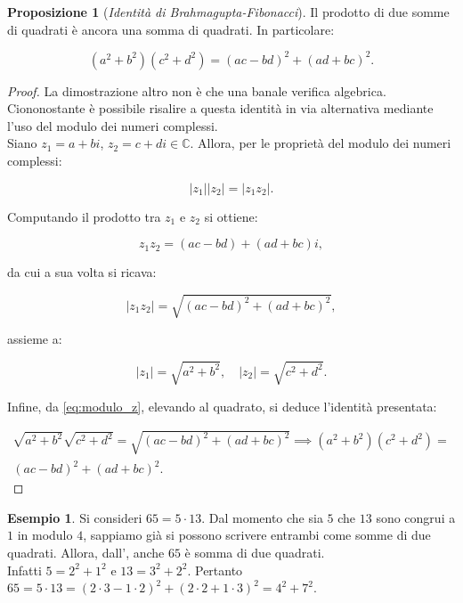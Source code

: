 \documentclass[a4paper]{article}
\newcommand{\norm}[1]{\left|#1\right|}
\newcommand{\CC}{\mathbb{C}}
\theoremstyle{definition}
\newtheorem{example}{Esempio}[section]
\newtheorem{proposition}{Proposizione}[section]
\begin{document}
\begin{proposition}[\textit{Identità di Brahmagupta-Fibonacci}]
    \label{prop:fibonacci}
    Il prodotto di due somme di quadrati è ancora una
    somma di quadrati. In particolare:

    \[ (a^2+b^2)(c^2+d^2)=(ac-bd)^2+(ad+bc)^2. \]
\end{proposition}

\begin{proof}
    La dimostrazione altro non è che una banale verifica
    algebrica. Ciononostante è possibile risalire a questa
    identità in via alternativa mediante l'uso
    del modulo dei numeri complessi. \\

    Siano $z_1=a+bi$, $z_2=c+di \in \CC$. Allora, per le proprietà
    del modulo dei numeri complessi:

    \begin{equation}
        \label{eq:modulo_z}
        \norm{z_1}\norm{z_2}=\norm{z_1z_2}.
    \end{equation}


    Computando il prodotto tra $z_1$ e $z_2$ si ottiene:

    \[ z_1z_2 = (ac-bd) + (ad+bc)i, \]

    da cui a sua volta si ricava:

    \[ \norm{z_1z_2} = \sqrt{(ac-bd)^2 + (ad+bc)^2}, \]

    assieme a:

    \[ \norm{z_1}=\sqrt{a^2+b^2}, \quad \norm{z_2}=\sqrt{c^2+d^2}. \]

    Infine, da \eqref{eq:modulo_z}, elevando al quadrato, si deduce l'identità
    presentata:

    \begin{multline*}
        \sqrt{a^2+b^2}\sqrt{c^2+d^2}=\sqrt{(ac-bd)^2 + (ad+bc)^2} \implies (a^2+b^2)(c^2+d^2)= \\ (ac-bd)^2+(ad+bc)^2.
    \end{multline*}
\end{proof}

\begin{example}
    Si consideri $65=5 \cdot 13$. Dal momento che sia $5$
    che $13$ sono congrui a $1$ in modulo $4$, sappiamo
    già si possono scrivere entrambi come somme di due
    quadrati. Allora, dall',
    anche $65$ è somma di due quadrati. \\

    Infatti $5=2^2+1^2$ e $13=3^2+2^2$. Pertanto
    $65=5\cdot 13=(2\cdot3-1\cdot2)^2 + (2\cdot2+1\cdot3)^2=4^2+7^2$.
\end{example}
\end{document}
